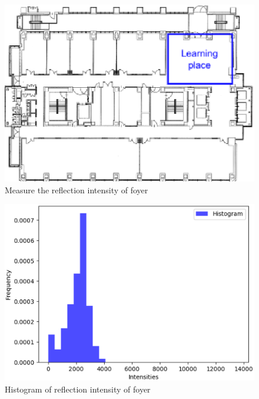   \begin{figure}[h]
    \centering
    \includegraphics[keepaspectratio, scale=0.50] {images/eps/RobotGuidance_exp3_foyer}
    \captionsetup{justification=raggedright} %
    \caption{Measure the reflection intensity of foyer}
    \label{Fig:RobotGuidance_exp3_foyer}
  \end{figure}

  \begin{figure}[h]
    \centering
    \includegraphics[keepaspectratio, scale=0.50] {images/eps/RobotGuidance_plot_reflection_intensities_of_foyer}
    \captionsetup{justification=raggedright} %
    \caption{Histogram of reflection intensity of foyer}
    \label{Fig:Histogram of reflection intensity of foyer}
  \end{figure}

